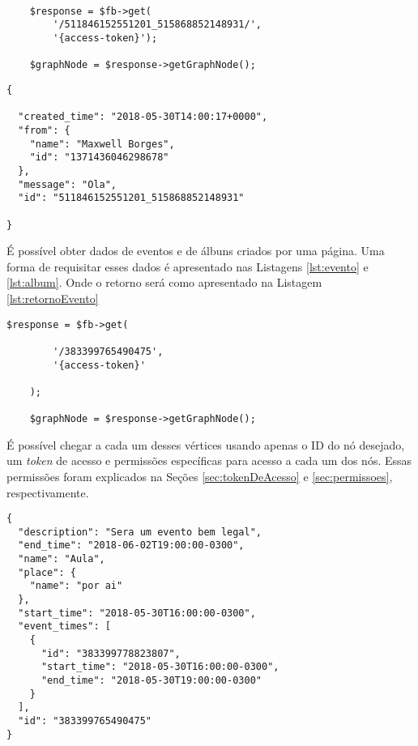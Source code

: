 \begin{lstlisting}[caption={Requisitar informações de um comentário específico},label={lst:comentario}]
    
    $response = $fb->get(
        '/511846152551201_515868852148931/',
        '{access-token}');
        
    $graphNode = $response->getGraphNode();
\end{lstlisting}

\begin{lstlisting}[caption={Resposta do servidor a requisição \ref{lst:comentario}},label={lst:retornoComentario}]
{

  "created_time": "2018-05-30T14:00:17+0000",
  "from": {
    "name": "Maxwell Borges",
    "id": "1371436046298678"
  },
  "message": "Ola",
  "id": "511846152551201_515868852148931"
  
}
\end{lstlisting}

É possível obter dados de eventos e de álbuns criados por uma página. Uma forma de requisitar esses dados é apresentado nas Listagens \ref{lst:evento} e \ref{lst:album}. Onde o retorno será como apresentado na Listagem \ref{lst:retornoEvento}

\begin{lstlisting}[caption={Requisitar uma evento específico},label={lst:evento}]
	$response = $fb->get(
	
    	'/383399765490475',
    	'{access-token}'
    	
	);
	
	$graphNode = $response->getGraphNode();
\end{lstlisting}

É possível chegar a cada um desses vértices usando apenas o ID do nó desejado, um \textit{token} de acesso e permissões específicas para acesso a cada um dos nós. Essas permissões foram explicados na Seções \ref{sec:tokenDeAcesso} e \ref{sec:permissoes}, respectivamente.

\begin{lstlisting}[caption={Resposta do servidor a requisição \ref{lst:evento}},label={lst:retornoEvento}]
{
  "description": "Sera um evento bem legal",
  "end_time": "2018-06-02T19:00:00-0300",
  "name": "Aula",
  "place": {
    "name": "por ai"
  },
  "start_time": "2018-05-30T16:00:00-0300",
  "event_times": [
    {
      "id": "383399778823807",
      "start_time": "2018-05-30T16:00:00-0300",
      "end_time": "2018-05-30T19:00:00-0300"
    }
  ],
  "id": "383399765490475"
}
\end{lstlisting}

